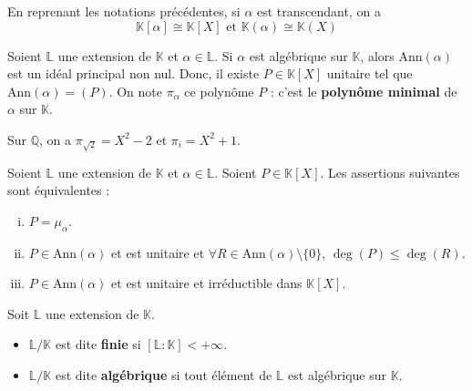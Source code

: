 	\begin{proposition}
		En reprenant les notations précédentes, si $\alpha$ est transcendant, on a
		\[ \mathbb{K}[\alpha] \cong \mathbb{K}[X] \text{ et } \mathbb{K}(\alpha) \cong \mathbb{K}(X) \]
	\end{proposition}
	
	\begin{definition}
		Soient $\mathbb{L}$ une extension de $\mathbb{K}$ et $\alpha \in \mathbb{L}$. Si $\alpha$ est algébrique sur $\mathbb{K}$, alors $\mathrm{Ann}(\alpha)$ est un idéal principal non nul. Donc, il existe $P \in \mathbb{K}[X]$ unitaire tel que $\mathrm{Ann}(\alpha) = (P)$. On note $\pi_\alpha$ ce polynôme $P$ : c'est le \textbf{polynôme minimal} de $\alpha$ sur $\mathbb{K}$.
	\end{definition}
	
	\begin{example}
		Sur $\mathbb{Q}$, on a $\pi_{\sqrt{2}} = X^2 - 2$ et $\pi_i = X^2 + 1$.
	\end{example}
	
	
	\begin{proposition}
		Soient $\mathbb{L}$ une extension de $\mathbb{K}$ et $\alpha \in \mathbb{L}$. Soient $P \in \mathbb{K}[X]$. Les assertions suivantes sont équivalentes :
		\begin{enumerate}[(i)]
			\item $P = \mu_\alpha$.
			\item $P \in \mathrm{Ann}(\alpha)$ et est unitaire et $\forall R \in \mathrm{Ann}(\alpha) \setminus \{ 0 \}, \, \deg(P) \leq \deg(R)$.
			\item $P \in \mathrm{Ann}(\alpha)$ et est unitaire et irréductible dans $\mathbb{K}[X]$.
		\end{enumerate}
	\end{proposition}
	
	
	\begin{definition}
		Soit $\mathbb{L}$ une extension de $\mathbb{K}$.
		\begin{itemize}
			\item $\mathbb{L}/\mathbb{K}$ est dite \textbf{finie} si $[\mathbb{L}:\mathbb{K}] < +\infty$.
			\item $\mathbb{L}/\mathbb{K}$ est dite \textbf{algébrique} si tout élément de $\mathbb{L}$ est algébrique sur $\mathbb{K}$.
		\end{itemize}
	\end{definition}
	
